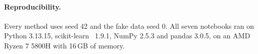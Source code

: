 \paragraph{Reproducibility.}
Every method uses seed 42 and the fake data seed 0. All seven notebooks ran on Python 3.13.15,
scikit-learn~\cite{pedregosa2011} 1.9.1, NumPy 2.5.3 and pandas 3.0.5, on an AMD Ryzen 7 5800H with
16\,GB of memory.
